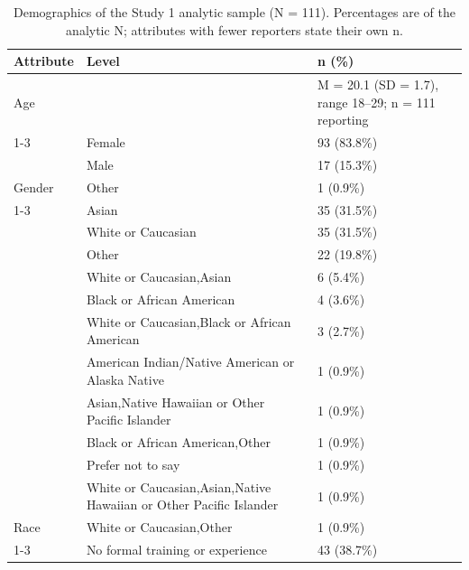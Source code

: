 \begin{table}[!h]
\centering
\caption{\label{tab:supp_demographics}Demographics of the Study 1 analytic sample (N = 111). Percentages are of the analytic N; attributes with fewer reporters state their own n.}
\centering
\fontsize{9}{11}\selectfont
\begin{tabular}[t]{lll}
\toprule
Attribute & Level & n (\%)\\
\midrule
Age &  & M = 20.1 (SD = 1.7), range 18–29; n = 111 reporting\\
\cmidrule{1-3}
 & Female & 93 (83.8\%)\\

 & Male & 17 (15.3\%)\\

\multirow{-3}{*}{\raggedright\arraybackslash Gender} & Other & 1 (0.9\%)\\
\cmidrule{1-3}
 & Asian & 35 (31.5\%)\\

 & White or Caucasian & 35 (31.5\%)\\

 & Other & 22 (19.8\%)\\

 & White or Caucasian,Asian & 6 (5.4\%)\\

 & Black or African American & 4 (3.6\%)\\

 & White or Caucasian,Black or African American & 3 (2.7\%)\\

 & American Indian/Native American or Alaska Native & 1 (0.9\%)\\

 & Asian,Native Hawaiian or Other Pacific Islander & 1 (0.9\%)\\

 & Black or African American,Other & 1 (0.9\%)\\

 & Prefer not to say & 1 (0.9\%)\\

 & White or Caucasian,Asian,Native Hawaiian or Other Pacific Islander & 1 (0.9\%)\\

\multirow{-12}{*}{\raggedright\arraybackslash Race} & White or Caucasian,Other & 1 (0.9\%)\\
\cmidrule{1-3}
 & No formal training or experience & 43 (38.7\%)\\


\end{tabular}
\end{table}
